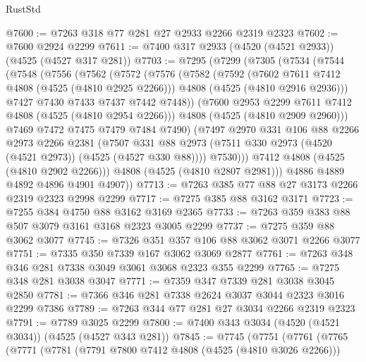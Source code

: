 \begin{lexlean}{RustStd}
\begin{coremodule}
@7600 := @7263 @318 @77 @281 @27 @2933 @2266 @2319 @2323
@7602 := @7600 @2924 @2299
@7611 := @7400 @317 @2933 (@4520 (@4521 @2933)) (@4525 (@4527 @317 @281))
@7703 := @7295
    (@7299
      (@7305
        (@7534
          (@7544
            (@7548
              (@7556
                (@7562
                  (@7572
                    (@7576
                      (@7582
                        (@7592
                          (@7602 @7611 @7412 @4808 (@4525 (@4810 @2925 @2266)))
                          @4808
                          (@4525 (@4810 @2916 @2936)))
                        @7427
                        @7430
                        @7433
                        @7437
                        @7442
                        @7448))
                    (@7600 @2953 @2299 @7611 @7412 @4808 (@4525 (@4810 @2954 @2266)))
                    @4808
                    (@4525 (@4810 @2909 @2960)))
                  @7469
                  @7472
                  @7475
                  @7479
                  @7484
                  @7490)
                (@7497
                  @2970
                  @331
                  @106
                  @88
                  @2266
                  @2973
                  @2266
                  @2381
                  (@7507
                    @331
                    @88
                    @2973
                    (@7511 @330 @2973 (@4520 (@4521 @2973)) (@4525 (@4527 @330 @88))))
                  @7530)))
            @7412
            @4808
            (@4525 (@4810 @2902 @2266)))
          @4808
          (@4525 (@4810 @2807 @2981)))
        @4886
        @4889
        @4892
        @4896
        @4901
        @4907))
@7713 := @7263 @385 @77 @88 @27 @3173 @2266 @2319 @2323 @2998 @2299
@7717 := @7275 @385 @88 @3162 @3171
@7723 := @7255 @384 @4750 @88 @3162 @3169 @2365
@7733 := @7263 @359 @383 @88 @507 @3079 @3161 @3168 @2323 @3005 @2299
@7737 := @7275 @359 @88 @3062 @3077
@7745 := @7326 @351 @357 @106 @88 @3062 @3071 @2266 @3077
@7751 := @7335 @350 @7339 @167 @3062 @3069 @2877
@7761 := @7263 @348 @346 @281 @7338 @3049 @3061 @3068 @2323 @355 @2299
@7765 := @7275 @348 @281 @3038 @3047
@7771 := @7359 @347 @7339 @281 @3038 @3045 @2850
@7781 := @7366 @346 @281 @7338 @2624 @3037 @3044 @2323 @3016 @2299 @7386
@7789 := @7263 @344 @77 @281 @27 @3034 @2266 @2319 @2323
@7791 := @7789 @3025 @2299
@7800 := @7400 @343 @3034 (@4520 (@4521 @3034)) (@4525 (@4527 @343 @281))
@7845 := @7745
    (@7751
      (@7761
        (@7765
          (@7771
            (@7781
              (@7791 @7800 @7412 @4808 (@4525 (@4810 @3026 @2266)))

\end{coremodule}
\end{lexlean}
